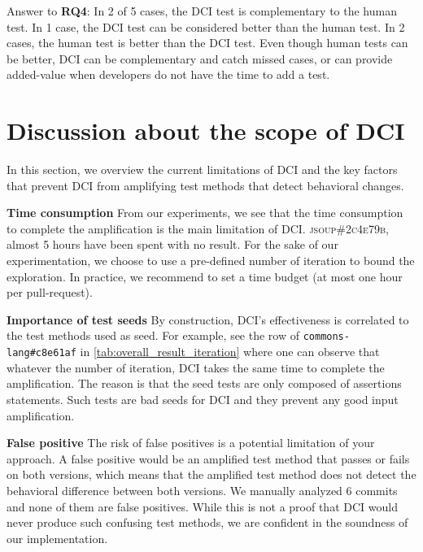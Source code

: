 \begin{mdframed}
Answer to \textbf{RQ4}: 
In 2 of 5 cases, the DCI test is complementary to the human test.
In 1 case, the DCI test can be considered better than the human test.
In 2 cases, the human test is better than the DCI test.
Even though human tests can be better, DCI can be complementary and catch missed cases, or can provide added-value when developers do not have the time to add a test.
\end{mdframed}



\section{Discussion about the scope of DCI}
\label{sec:limitation}

In this section, we overview the current limitations of DCI and the key factors that prevent DCI from amplifying test methods that detect behavioral changes.

\textbf{Time consumption}
From our experiments, we see that the time consumption to complete the amplification is the main limitation of DCI.
\textsc{jsoup\#2c4e79b}, almost 5 hours have been spent with no result.
For the sake of our experimentation, we choose to use a pre-defined number of iteration to bound the exploration.
In practice, we recommend to set a time budget (\eg at most one hour per pull-request).

\textbf{Importance of test seeds}
By construction, DCI's effectiveness is correlated to the test methods used as seed.
For example, see the row of \texttt{commons-lang\#c8e61af} in \autoref{tab:overall_result_iteration}
where one can observe that whatever the number of iteration, DCI takes the same time to complete the amplification.
The reason is that the seed tests are only composed of assertions statements.
Such tests are bad seeds for DCI and they prevent any good input amplification.

\textbf{False positive}
The risk of false positives is a potential  limitation of your approach.
A false positive would be an amplified test method that passes or fails on both versions, which means that the amplified test method does not detect the behavioral difference between both versions.
We manually  analyzed 6 commits and none of them are false positives.
While this is not a proof that DCI would never produce such confusing test methods, we are confident in the soundness of our implementation.

